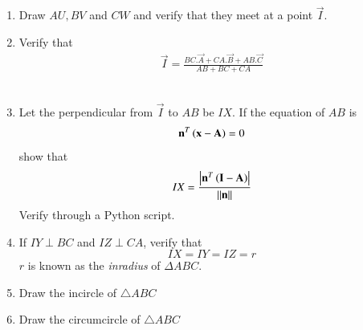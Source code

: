 \documentclass[journal,12pt,twocolumn]{IEEEtran}
\renewcommand\thesection{\arabic{section}}
\begin{document}
\begin{enumerate}[label=\thesection.\arabic*
,ref=\thesection.\theenumi]
\begin{equation}
\begin{pmatrix}
1.15
\\
0.14
\end{pmatrix}
\end{equation}
%
It is easy to verify that even $BV$ and $CW$ meet at the same point.  $\vec{I}$ is known as
the {\em incentre} of $\Delta ABC$. 
\item
Draw $AU, BV$ and $CW$ and verify that they meet at a point $\vec{I}$.  
\item
Verify that
\begin{align}
\vec{I} = \frac{BC.\vec{A} + CA.\vec{B} + AB.\vec{C}}{AB+BC+CA}
\end{align}
%
\\
\item
\label{prob:incircle_normal}
Let the perpendicular from $\vec{I}$ to $AB$ be $IX$. If the equation of $AB$ is
%
\begin{align}
\mathbf{n}^T\left(\mathbf{x}-\mathbf{A}\right) = 0
\end{align}
%
show that
\begin{align}
IX = \frac{\left\vert\mathbf{n}^T\left(\mathbf{I}-\mathbf{A}\right)\right\vert}{\lVert\mathbf{n}\rVert}
\end{align}
%
Verify through a Python script.
\item If $IY \perp BC$ and $IZ \perp CA$,
verify that
\begin{equation}
IX = IY = IZ = r
\end{equation}
$r$ is known as the {\em inradius} of $\Delta ABC$.
%
\item Draw the incircle of $\triangle ABC$
\item Draw the circumcircle of $\triangle ABC$

\end{enumerate}
\end{document}
